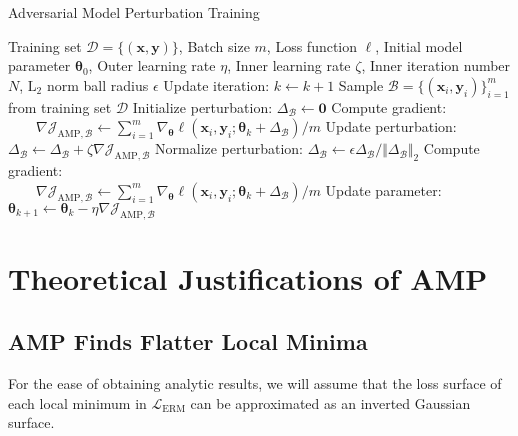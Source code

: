 \documentclass[final]{cvpr}
\begin{document}
\begin{algorithm}[!htbp]
\caption{Adversarial Model Perturbation Training}
\label{alg:amp}
\begin{algorithmic}[1]
\REQUIRE Training set $\mathcal{D}=\{(\boldsymbol{x},\boldsymbol{y})\}$, Batch size $m$, Loss function $\ell$, Initial model parameter $\boldsymbol{\theta}_0$, Outer learning rate $\eta$, Inner learning rate $\zeta$, Inner iteration number $N$, $\text{L}_2$ norm ball radius $\epsilon$
\STATE Update iteration: $k\gets k+1$
\STATE Sample $\mathcal{B}=\{(\boldsymbol{x}_i,\boldsymbol{y}_i)\}_{i=1}^m$ from training set $\mathcal{D}$
\STATE Initialize perturbation: $\Delta_\mathcal{B}\gets\boldsymbol{0}$
\STATE Compute gradient: \\ $\!\!\!\!\!\!\qquad\nabla\mathcal{J}_{\mathrm{AMP},\mathcal{B}}\gets\sum_{i=1}^m\nabla_{\boldsymbol{\theta}}\ell(\boldsymbol{x}_i,\boldsymbol{y}_i;\boldsymbol{\theta}_k+\Delta_\mathcal{B})/m$
\STATE Update perturbation: $\Delta_\mathcal{B}\gets\Delta_\mathcal{B}+\zeta\nabla\mathcal{J}_{\mathrm{AMP},\mathcal{B}}$
\STATE Normalize perturbation: $\Delta_\mathcal{B}\gets\epsilon\Delta_\mathcal{B}/\Vert\Delta_\mathcal{B}\Vert_2$
\ENDIF
\ENDFOR
\STATE Compute gradient: \\ $\qquad\nabla\mathcal{J}_{\mathrm{AMP},\mathcal{B}}\gets\sum_{i=1}^m\nabla_{\boldsymbol{\theta}}\ell(\boldsymbol{x}_i,\boldsymbol{y}_i;\boldsymbol{\theta}_k+\Delta_\mathcal{B})/m$
\STATE Update parameter: $\boldsymbol{\theta}_{k+1}\gets\boldsymbol{\theta}_k-\eta\nabla\mathcal{J}_{\mathrm{AMP},\mathcal{B}}$
\ENDWHILE
\end{algorithmic}
\end{algorithm}

\section{Theoretical Justifications of AMP}\label{sec:just}

\subsection{AMP Finds Flatter Local Minima}

For the ease of obtaining analytic results, we will assume that
the loss surface of each local minimum in $\mathcal{L}_\mathrm{ERM}$ can be approximated as an inverted Gaussian surface. 
\end{document}
